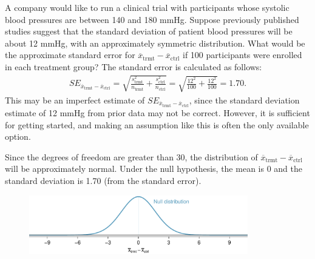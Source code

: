 \begin{examplewrap}
\begin{nexample}{A company would like to run a clinical trial with participants whose systolic blood pressures are between 140 and 180 mmHg. Suppose previously published studies suggest that the standard deviation of patient blood pressures will be about 12 mmHg, with an approximately symmetric distribution.\footnotemark{} What would be the approximate standard error for $\overline{x}_{ \text{trmt}} - \overline{x}_{ \text{ctrl}}$ if 100 participants were enrolled in each treatment group?}
The standard error is calculated as follows:
\begin{align*}
SE_{\overline{x}_{ \text{trmt}} - \overline{x}_{ \text{ctrl}}}
  = \sqrt{\frac{s_{ \text{trmt}}^2}{n_{ \text{trmt}}} + \frac{s_{ \text{ctrl}}^2}{n_{ \text{ctrl}}}}
  = \sqrt{\frac{12^2}{100} + \frac{12^2}{100}}
  = 1.70.
\end{align*}
This may be an imperfect estimate of $SE_{\overline{x}_{ \text{trmt}} - \overline{x}_{\text{ctrl}}}$, since the standard deviation estimate of 12 mmHg from prior data may not be correct. However, it is sufficient for getting started, and making an assumption like this is often the only available option. 
\end{nexample}
\end{examplewrap}

\textD{\newpage}

Since the degrees of freedom are greater than 30, the distribution of $\overline{x}_{ \text{trmt}} - \overline{x}_{ \text{ctrl}}$ will be approximately normal. Under the null hypothesis, the mean is 0 and the standard deviation is 1.70 (from the standard error).

\begin{figure}[h]
	\centering
	\includegraphics[width=0.85\textwidth]{ch_inference_for_means_oi_biostat/figures/power_null_0_1-7/power_null_A_0_1-7}
\end{figure} 



